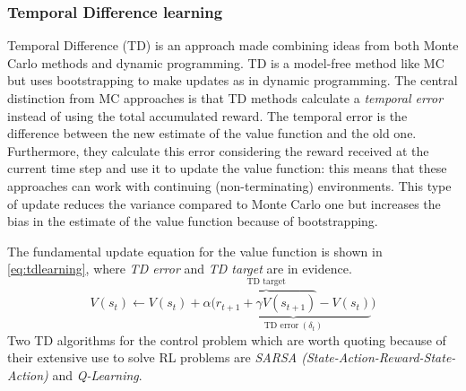 \subsubsection{Temporal Difference learning} \label{tdlearn}

Temporal Difference (TD) is an approach made combining ideas from both Monte Carlo methods and dynamic programming. TD is a model-free method like MC but uses bootstrapping to make updates as in dynamic programming. The central distinction from MC approaches is that TD methods calculate a \textit{temporal error} instead of using the total accumulated reward. The temporal error is the difference between the new estimate of the value function and the old one. Furthermore, they calculate this error considering the reward received at the current time step and use it to update the value function: this means that these approaches can work with continuing (non-terminating) environments.
This type of update reduces the variance compared to Monte Carlo one but increases the bias in the estimate of the value function because of bootstrapping.

The fundamental update equation for the value function is shown in \vref{eq:tdlearning}, where \textit{TD error} and \textit{TD target} are in evidence.
\begin{equation}\label{eq:tdlearning}
	V(s_t) \leftarrow V(s_t) + \alpha \big(\underbrace{\overbrace{r_{t+1} + \gamma V(s_{t+1})}^{\text{TD target}}- V(s_t)}_{\text{TD error} \ (\delta_t)}\big)
\end{equation}
Two TD algorithms for the control problem which are worth quoting because of their extensive use to solve RL problems are \textit{SARSA (State-Action-Reward-State-Action)} and \textit{Q-Learning}.

